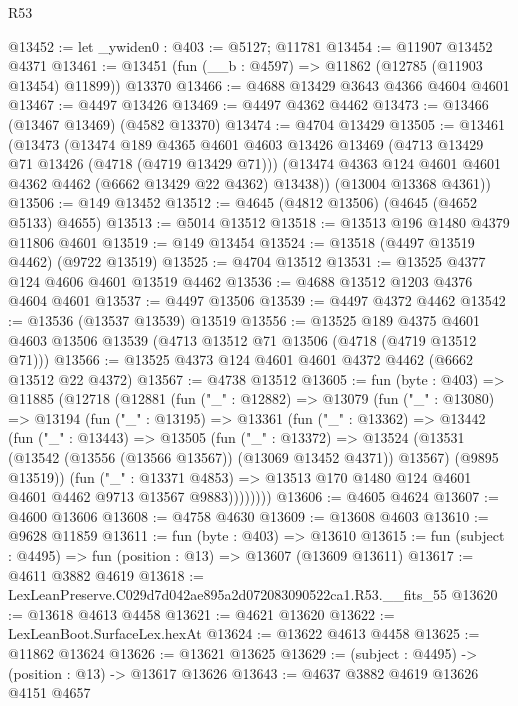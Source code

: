 \begin{lexlean}{R53}
\begin{coremodule}
@13452 := let _ywiden0 : @403 := @5127; @11781
@13454 := @11907 @13452 @4371
@13461 := @13451 (fun (__b : @4597) => @11862 (@12785 (@11903 @13454) @11899)) @13370
@13466 := @4688 @13429 @3643 @4366 @4604 @4601
@13467 := @4497 @13426
@13469 := @4497 @4362 @4462
@13473 := @13466 (@13467 @13469) (@4582 @13370)
@13474 := @4704 @13429
@13505 := @13461
    (@13473
      (@13474
        @189
        @4365
        @4601
        @4603
        @13426
        @13469
        (@4713 @13429 @71 @13426 (@4718 (@4719 @13429 @71)))
        (@13474 @4363 @124 @4601 @4601 @4362 @4462 (@6662 @13429 @22 @4362) @13438))
      (@13004 @13368 @4361))
@13506 := @149 @13452
@13512 := @4645 (@4812 @13506) (@4645 (@4652 @5133) @4655)
@13513 := @5014 @13512
@13518 := @13513 @196 @1480 @4379 @11806 @4601
@13519 := @149 @13454
@13524 := @13518 (@4497 @13519 @4462) (@9722 @13519)
@13525 := @4704 @13512
@13531 := @13525 @4377 @124 @4606 @4601 @13519 @4462
@13536 := @4688 @13512 @1203 @4376 @4604 @4601
@13537 := @4497 @13506
@13539 := @4497 @4372 @4462
@13542 := @13536 (@13537 @13539) @13519
@13556 := @13525
    @189
    @4375
    @4601
    @4603
    @13506
    @13539
    (@4713 @13512 @71 @13506 (@4718 (@4719 @13512 @71)))
@13566 := @13525 @4373 @124 @4601 @4601 @4372 @4462 (@6662 @13512 @22 @4372)
@13567 := @4738 @13512
@13605 := fun (byte : @403) =>
  @11885
    (@12718
      (@12881
        (fun ("_" : @12882) =>
        @13079
          (fun ("_" : @13080) =>
          @13194
            (fun ("_" : @13195) =>
            @13361
              (fun ("_" : @13362) =>
              @13442
                (fun ("_" : @13443) =>
                @13505
                  (fun ("_" : @13372) =>
                  @13524
                    (@13531 (@13542 (@13556 (@13566 @13567)) (@13069 @13452 @4371)) @13567)
                    (@9895 @13519))
                  (fun ("_" : @13371 @4853) =>
                  @13513 @170 @1480 @124 @4601 @4601 @4462 @9713 @13567 @9883))))))))
@13606 := @4605 @4624
@13607 := @4600 @13606
@13608 := @4758 @4630
@13609 := @13608 @4603
@13610 := @9628 @11859
@13611 := fun (byte : @403) => @13610
@13615 := fun (subject : @4495) => fun (position : @13) => @13607 (@13609 @13611)
@13617 := @4611 @3882 @4619
@13618 := LexLeanPreserve.C029d7d042ae895a2d072083090522ca1.R53.__fits_55
@13620 := @13618 @4613 @4458
@13621 := @4621 @13620
@13622 := LexLeanBoot.SurfaceLex.hexAt
@13624 := @13622 @4613 @4458
@13625 := @11862 @13624
@13626 := @13621 @13625
@13629 := (subject : @4495) -> (position : @13) -> @13617 @13626
@13643 := @4637
    @3882
    @4619
    @13626
    @4151
    @4657

\end{coremodule}
\end{lexlean}

